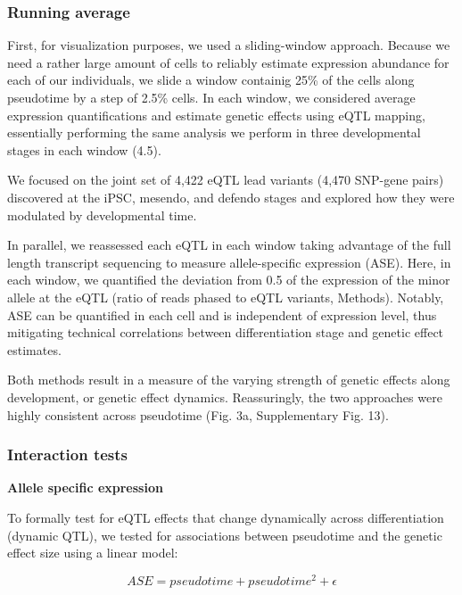 \subsubsection{Running average}

First, for visualization purposes, we used a sliding-window approach. 
Because we need a rather large amount of cells to reliably estimate expression abundance for each of our individuals, we slide a window containig 25\% of the cells along pseudotime by a step of 2.5\% cells.
In each window, we considered average expression quantifications and estimate genetic effects using eQTL mapping, essentially performing the same analysis we perform in three developmental stages in each window (4.5). 

We focused on the joint set of 4,422 eQTL lead variants (4,470 SNP-gene pairs) discovered at the iPSC, mesendo, and defendo stages and explored how they were modulated by developmental time.

In parallel, we reassessed each eQTL in each window taking advantage of the full length transcript sequencing to measure allele-specific expression (ASE).
Here, in each window, we quantified the deviation from 0.5 of the expression of the minor allele at the eQTL (ratio of reads phased to eQTL variants, Methods). 
Notably, ASE can be quantified in each cell and is independent of expression level, thus mitigating technical correlations between differentiation stage and genetic effect estimates.

Both methods result in a measure of the varying strength of genetic effects along development, or genetic effect dynamics. 
Reassuringly, the two approaches were highly consistent across pseudotime (Fig. 3a, Supplementary Fig. 13).\\

\subsubsection{Interaction tests}

\textbf{Allele specific expression}

To formally test for eQTL effects that change dynamically across differentiation (dynamic QTL), we tested for associations between pseudotime and the genetic effect size using a linear model:

\begin{equation}
    ASE = pseudotime + pseudotime^2 + \epsilon
\end{equation}


